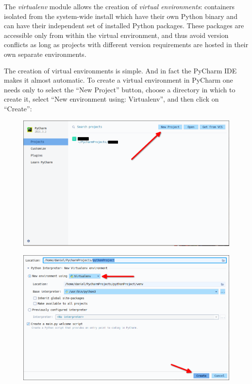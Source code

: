 \documentclass[a4paper,12pt]{article}
\begin{document}
The {\slshape virtualenv} module allows the creation of {\itshape virtual environments}: containers isolated from the system-wide install which have their own Python binary and can have their independent set of installed Python packages. These packages are accessible only from within the virtual environment, and thus avoid version conflicts as long as projects with different version requirements are hosted in their own separate environments.

The creation of virtual environments is simple. And in fact the PyCharm IDE makes it almost automatic. To create a virtual environment in PyCharm one needs only to select the ``New Project'' button, choose a directory in which to create it, select ``New environment using: Virtualenv'', and then click on ``Create'':

\begin{figure}[!ht]
    \begin{center}
        \includegraphics[scale=0.5]{pycharm-new-project.png}
    \end{center}
\end{figure}

\begin{figure}[!ht]
    \begin{center}
        \includegraphics[scale=0.5]{pycharm-create.png}
    \end{center}
\end{figure}
\end{document}
